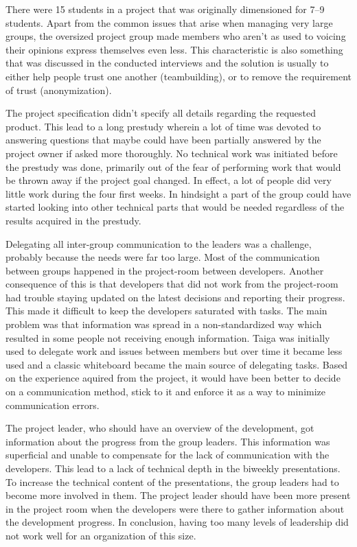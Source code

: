There were 15 students in a project that was originally dimensioned for 7--9 students. Apart from the common issues that arise when managing very large groups, the oversized project group made members who aren't as used to voicing their opinions express themselves even less. This characteristic is also something that was discussed in the conducted interviews and the solution is usually to either help people trust one another (teambuilding), or to remove the requirement of trust (anonymization). 

The project specification didn't specify all details regarding the requested product. This lead to a long prestudy wherein a lot of time was devoted to answering questions that maybe could have been partially answered by the project owner if asked more thoroughly. No technical work was initiated before the prestudy was done, primarily out of the fear of performing work that would be thrown away if the project goal changed. In effect, a lot of people did very little work during the four first weeks. In hindsight a part of the group could have started looking into other technical parts that would be needed regardless of the results acquired in the prestudy.

Delegating all inter-group communication to the leaders was a challenge, probably because the needs were far too large. Most of the communication between groups happened in the project-room between developers. Another consequence of this is that developers that did not work from the project-room had trouble staying updated on the latest decisions and reporting their progress. This made it difficult to keep the developers saturated with tasks. The main problem was that information was spread in a non-standardized way which resulted in some people not receiving enough information. Taiga was initially used to delegate work and issues between members but over time it became less used and a classic whiteboard became the main source of delegating tasks. Based on the experience aquired from the project, it would have been better to decide on a communication method, stick to it and enforce it as a way to minimize communication errors.

The project leader, who should have an overview of the development, got information about the progress from the group leaders. This information was superficial and unable to compensate for the lack of communication with the developers. This lead to a lack of technical depth in the biweekly presentations. To increase the technical content of the presentations, the group leaders had to become more involved in them. The project leader should have been more present in the project room when the developers were there to gather information about the development progress. In conclusion, having too many levels of leadership did not work well for an organization of this size.

